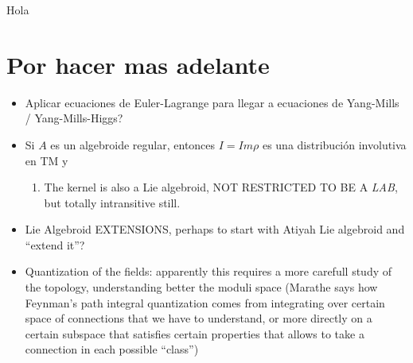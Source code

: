 Hola \cite{Reyes2013}

\section{Por hacer mas adelante}
\begin{itemize}
    \item Aplicar ecuaciones de Euler-Lagrange para llegar a ecuaciones de Yang-Mills / Yang-Mills-Higgs?
    
    \item Si $A$ es un algebroide regular, entonces $I = Im \rho$ es una distribución involutiva en TM y 
    
    \begin{enumerate}
        \item The kernel is also a Lie algebroid, NOT RESTRICTED TO BE A \emph{LAB}, but totally intransitive still.
    \end{enumerate}
    
    
    \item Lie Algebroid EXTENSIONS, perhaps to start with Atiyah Lie algebroid and ``extend it''?
    
    \item Quantization of the fields: apparently this requires a more carefull study of the topology, understanding better the moduli space (Marathe says how Feynman's path integral quantization comes from integrating over certain space of connections that we have to understand, or more directly on a certain subspace that satisfies certain properties that allows to take a connection in each possible ``class'')
\end{itemize}